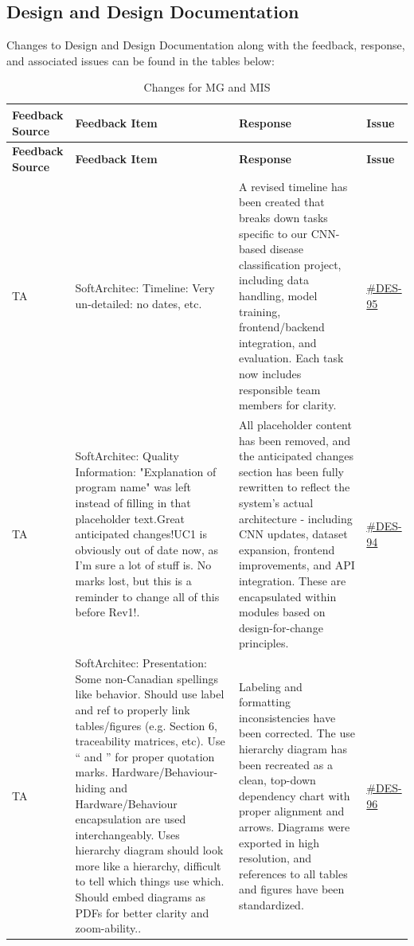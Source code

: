 \documentclass{article}
\begin{document}
\subsection{Design and Design Documentation}
Changes to Design and Design Documentation along with the feedback, response, and associated
issues can be found in the tables below:
\renewcommand{\arraystretch}{1.3}
\begin{longtable}{|p{1.48cm}|p{5cm}|p{4.7cm}|p{1cm}|}
\caption{Changes for MG and MIS} \\
\hline
\textbf{Feedback Source} & \textbf{Feedback Item} & \textbf{Response} & \textbf{Issue} \\
\hline
\endfirsthead

\hline
\textbf{Feedback Source} & \textbf{Feedback Item} & \textbf{Response} & \textbf{Issue} \\
\hline
\endhead

TA & SoftArchitec: Timeline: Very un-detailed: no dates, etc. & A revised timeline has been created that breaks down tasks specific to our CNN-based disease classification project, including data handling, model training, frontend/backend integration, and evaluation. Each task now includes responsible team members for clarity. &\href{https://github.com/harrisonchiu/xray/issues/95}{\#DES-95}\\
\hline
\hline

TA & SoftArchitec: Quality Information: "Explanation of program name" was left instead of filling in that placeholder text.Great anticipated changes!UC1 is obviously out of date now, as I'm sure a lot of stuff is. No marks lost, but this is a reminder to change all of this before Rev1!. & All placeholder content has been removed, and the anticipated changes section has been fully rewritten to reflect the system's actual architecture - including CNN updates, dataset expansion, frontend improvements, and API integration. These are encapsulated within modules based on design-for-change principles. &\href{https://github.com/harrisonchiu/xray/issues/94}{\#DES-94}\\
\hline

TA & SoftArchitec: Presentation: Some non-Canadian spellings like behavior.
Should use label and ref to properly link tables/figures (e.g. Section 6, traceability matrices, etc).
Use `` and '' for proper quotation marks.
Hardware/Behaviour-hiding and Hardware/Behaviour encapsulation are used interchangeably.
Uses hierarchy diagram should look more like a hierarchy, difficult to tell which things use which.
Should embed diagrams as PDFs for better clarity and zoom-ability.. &Labeling and formatting inconsistencies have been corrected. The use hierarchy diagram has been recreated as a clean, top-down dependency chart with proper alignment and arrows. Diagrams were exported in high resolution, and references to all tables and figures have been standardized. &\href{https://github.com/harrisonchiu/xray/issues/96}{\#DES-96}\\
\hline


\end{longtable}
\end{document}
